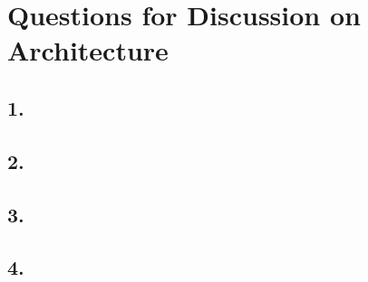 \documentclass[12pt]{article}
\begin{document}
\section*{Questions for Discussion on Architecture} %
\subsection*{1.} %
\subsection*{2.} %
\subsection*{3.} %
\subsection*{4.} %
\end{document}
